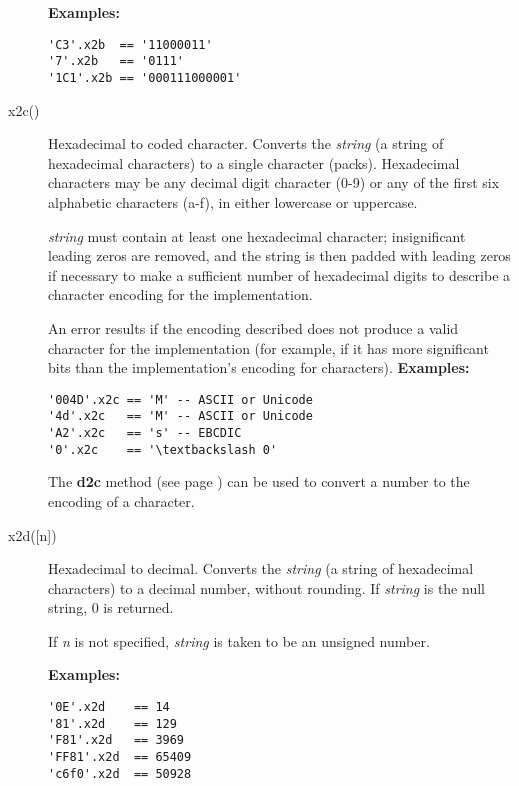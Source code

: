 \begin{description}
\textbf{Examples:}
\begin{lstlisting}
'C3'.x2b  == '11000011'
'7'.x2b   == '0111'
'1C1'.x2b == '000111000001'
\end{lstlisting}

\item[x2c()]\label{refx2c}
Hexadecimal to coded character.
Converts the \emph{string} (a string of hexadecimal characters) to
a single character (packs).
Hexadecimal characters may be any decimal digit character (0-9) or any
of the first six alphabetic characters (a-f), in either lowercase or
uppercase.
 
\emph{string} must contain at least one hexadecimal character;
insignificant leading zeros are removed, and the string is then padded
with leading zeros if necessary to make a sufficient number of
hexadecimal digits to describe a character encoding for the
implementation.
 
An error results if the encoding described does not produce a valid
character for the implementation (for example, if it has more
significant bits than the implementation's encoding for characters).
 \textbf{Examples:}
\begin{lstlisting}
'004D'.x2c == 'M' -- ASCII or Unicode
'4d'.x2c   == 'M' -- ASCII or Unicode
'A2'.x2c   == 's' -- EBCDIC
'0'.x2c    == '\textbackslash 0'
\end{lstlisting}
 The  \textbf{d2c} method (see page \pageref{refd2c})  can be used to
convert a \nr{} number to the encoding of a character.

\item[x2d([n{]})]\label{refx2d}
Hexadecimal to decimal.
Converts the \emph{string} (a string of hexadecimal characters) to
a decimal number, without rounding.
If \emph{string} is the null string, 0 is returned.
 
If \emph{n} is not specified, \emph{string} is taken to
be an unsigned number.
 
\textbf{Examples:}
\begin{lstlisting}
'0E'.x2d    == 14
'81'.x2d    == 129
'F81'.x2d   == 3969
'FF81'.x2d  == 65409
'c6f0'.x2d  == 50928
\end{lstlisting}
 

\end{description}
